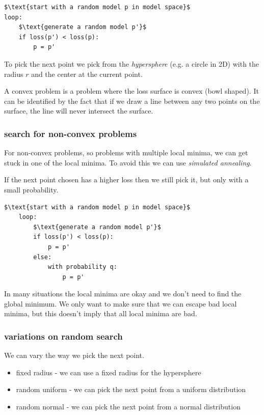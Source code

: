 \documentclass[12pt]{article}
\begin{document}
\begin{lstlisting}[caption=random search]
$\text{start with a random model p in model space}$
loop:
    $\text{generate a random model p'}$
    if loss(p') < loss(p):
        p = p'
\end{lstlisting}

To pick the next point we pick from the \textit{hypersphere} (e.g. a circle in 2D) with the radius $r$ and the center at the current point.

\begin{definition}
    A convex problem is a problem where the loss surface is convex (bowl shaped). It can be identified by the fact that if we draw a line between any two points on the surface, the line will never intersect the surface. 
\end{definition}

\subsubsection*{search for non-convex problems}

For non-convex problems, so problems with multiple local minima, we can get stuck in one of the local minima. To avoid this we can use \textit{simulated annealing}.

\begin{definition}
    If the next point chosen has a higher loss then we still pick it, but only with a small probability.    
\end{definition}
\begin{lstlisting}[caption=simulated annealing]
    $\text{start with a random model p in model space}$
    loop:
        $\text{generate a random model p'}$
        if loss(p') < loss(p):
            p = p'
        else:
            with probability q: 
                p = p'
\end{lstlisting}

In many situations the local minima are okay and we don't need to find the global minimum. We only want to make sure that we can escape bad local minima, but this doesn't imply that all local minima are bad.

\subsubsection*{variations on random search}

We can vary the way we pick the next point. 

\begin{itemize}[leftmargin=*, noitemsep]
    \item fixed radius - we can use a fixed radius for the hypersphere
    \item random uniform - we can pick the next point from a uniform distribution
    \item random normal - we can pick the next point from a normal distribution
\end{itemize}
\end{document}
